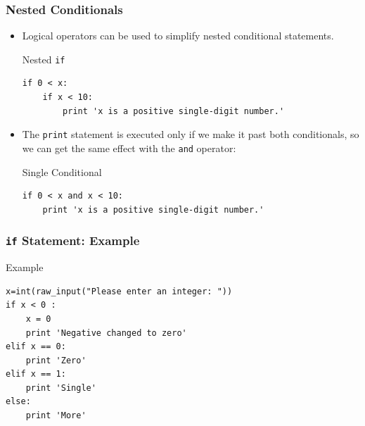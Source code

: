 \documentclass{beamer}
\begin{document}
\begin{frame}[fragile]
\frametitle{Nested Conditionals}
\begin{itemize}
\item \alert{Logical operators} can be used to  simplify nested conditional
statements.  
\begin{block}{Nested \texttt{if}}
\tiny
\begin{verbatim}
if 0 < x:
    if x < 10:
        print 'x is a positive single-digit number.'
\end{verbatim}
\end{block}
%
\item The {\tt print} statement is executed only if we make it past \alert{ both}
conditionals, so we can get the same effect with the {\tt and} operator:

\begin{block}{Single Conditional}
\tiny
\begin{verbatim}
if 0 < x and x < 10:
    print 'x is a positive single-digit number.'
\end{verbatim}
\end{block}
\end{itemize}

\end{frame}


\begin{frame}[fragile]
\frametitle{\texttt{if} Statement: Example}
\begin{block}{Example}
\small
\begin{verbatim}
x=int(raw_input("Please enter an integer: ")) 
if x < 0 :
    x = 0
    print 'Negative changed to zero' 
elif x == 0:
    print 'Zero' 
elif x == 1:
    print 'Single' 
else:
    print 'More'
\end{verbatim}
\end{block}
\end{frame}
\end{document}
